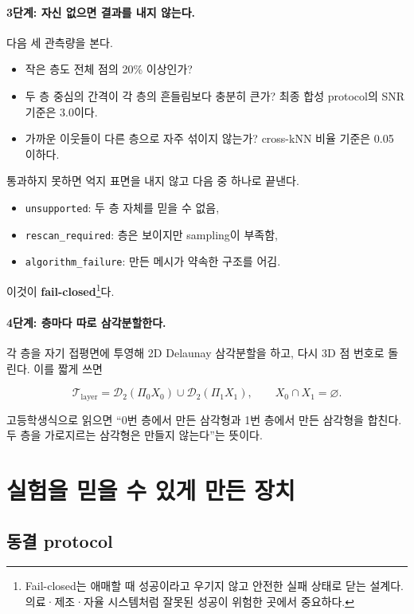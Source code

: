 \documentclass[11pt,a4paper]{article}
\newcommand{\code}[1]{\texttt{#1}}
\begin{document}
\paragraph{3단계: 자신 없으면 결과를 내지 않는다.}
다음 세 관측량을 본다.

\begin{itemize}
  \item 작은 층도 전체 점의 20\% 이상인가?
  \item 두 층 중심의 간격이 각 층의 흔들림보다 충분히 큰가? 최종 합성 protocol의
  SNR 기준은 3.0이다.
  \item 가까운 이웃들이 다른 층으로 자주 섞이지 않는가? cross-kNN 비율 기준은
  0.05 이하다.
\end{itemize}

통과하지 못하면 억지 표면을 내지 않고 다음 중 하나로 끝낸다.
\begin{itemize}
  \item \code{unsupported}: 두 층 자체를 믿을 수 없음,
  \item \code{rescan\_required}: 층은 보이지만 sampling이 부족함,
  \item \code{algorithm\_failure}: 만든 메시가 약속한 구조를 어김.
\end{itemize}
이것이 \textbf{fail-closed}\footnote{Fail-closed는 애매할 때 성공이라고 우기지 않고
안전한 실패 상태로 닫는 설계다. 의료·제조·자율 시스템처럼 잘못된 성공이 위험한
곳에서 중요하다.}다.

\paragraph{4단계: 층마다 따로 삼각분할한다.}
각 층을 자기 접평면에 투영해 2D Delaunay 삼각분할을 하고, 다시 3D 점 번호로
돌린다. 이를 짧게 쓰면

\begin{equation}
\mathcal{T}_{\mathrm{layer}}
=\mathcal{D}_2(\Pi_0X_0)\cup\mathcal{D}_2(\Pi_1X_1),
\qquad X_0\cap X_1=\varnothing.
\end{equation}

고등학생식으로 읽으면 ``0번 층에서 만든 삼각형과 1번 층에서 만든 삼각형을
합친다. 두 층을 가로지르는 삼각형은 만들지 않는다''는 뜻이다.

\section{실험을 믿을 수 있게 만든 장치}

\subsection{동결 protocol}
\end{document}
